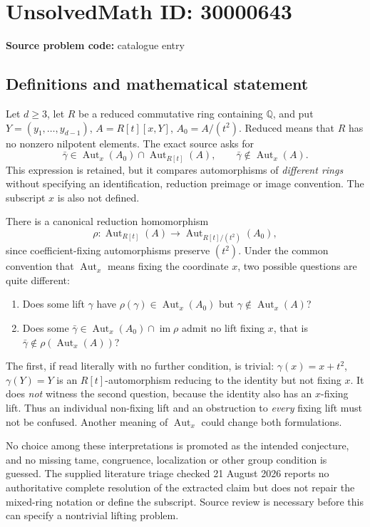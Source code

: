 \documentclass[11pt]{article}
\newcommand{\Q}{\mathbb{Q}}
\begin{document}
\section*{UnsolvedMath ID: 30000643}
\textbf{Source problem code:} catalogue entry
\subsection{Definitions and mathematical statement}
Let $d\geq3$, let $R$ be a reduced commutative ring containing $\Q$, and put $Y=(y_1,\ldots,y_{d-1})$, $A=R[t][x,Y]$, $A_0=A/(t^2)$. Reduced means that $R$ has no nonzero nilpotent elements. The exact source asks for
\[
 \bar\gamma\in\operatorname{Aut}_x(A_0)
                 \cap\operatorname{Aut}_{R[t]}(A),
 \qquad \bar\gamma\notin\operatorname{Aut}_x(A).
\]
This expression is retained, but it compares automorphisms of \emph{different rings} without specifying an identification, reduction preimage or image convention. The subscript $x$ is also not defined.

There is a canonical reduction homomorphism
\[
 \rho:\operatorname{Aut}_{R[t]}(A)
       \longrightarrow\operatorname{Aut}_{R[t]/(t^2)}(A_0),
\]
since coefficient-fixing automorphisms preserve $(t^2)$. Under the common convention that $\operatorname{Aut}_x$ means fixing the coordinate $x$, two possible questions are quite different:
\begin{enumerate}
\item Does some lift $\gamma$ have $\rho(\gamma)\in\operatorname{Aut}_x(A_0)$ but $\gamma\notin\operatorname{Aut}_x(A)$?
\item Does some $\bar\gamma\in\operatorname{Aut}_x(A_0)\cap\operatorname{im}\rho$ admit no lift fixing $x$, that is $\bar\gamma\notin\rho(\operatorname{Aut}_x(A))$?
\end{enumerate}
The first, if read literally with no further condition, is trivial: $\gamma(x)=x+t^2$, $\gamma(Y)=Y$ is an $R[t]$-automorphism reducing to the identity but not fixing $x$. It does \emph{not} witness the second question, because the identity also has an $x$-fixing lift. Thus an individual non-fixing lift and an obstruction to \emph{every} fixing lift must not be confused. Another meaning of $\operatorname{Aut}_x$ could change both formulations.

No choice among these interpretations is promoted as the intended conjecture, and no missing tame, congruence, localization or other group condition is guessed. The supplied literature triage checked 21 August 2026 reports no authoritative complete resolution of the extracted claim but does not repair the mixed-ring notation or define the subscript. Source review is necessary before this can specify a nontrivial lifting problem.
\end{document}
